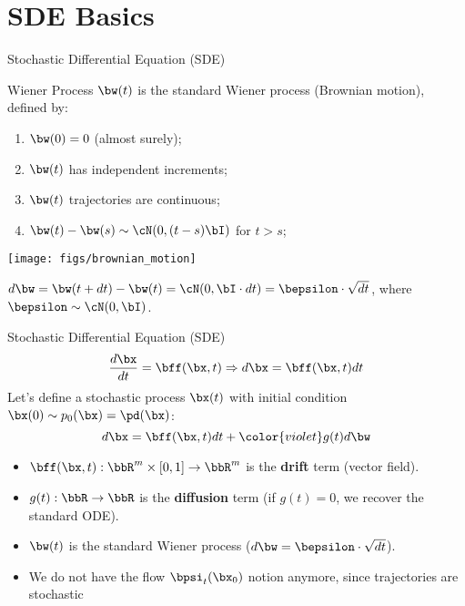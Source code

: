\documentclass{beamer}
\begin{document}
\section{SDE Basics}
\begin{frame}{Stochastic Differential Equation (SDE)}
	\begin{block}{Wiener Process}
		$\bw(t)$ is the standard Wiener process (Brownian motion), defined by:
		\vspace{-0.3cm}
		\begin{minipage}{0.5\columnwidth}
			\begin{enumerate}
				\item $\bw(0) = 0$ (almost surely);
				\item $\bw(t)$ has independent increments;
				\item $\bw(t)$ trajectories are continuous;
				\item $\bw(t) - \bw(s) \sim \cN(0, (t-s) \bI)$ for $t>s$;
			\end{enumerate}
		\end{minipage}%
		\begin{minipage}{0.45\columnwidth}
			\centering
			\texttt{[image: figs/brownian\_motion]}
		\end{minipage}
	\end{block}
	\eqpause
	$d\bw = \bw(t+dt) - \bw(t) = \cN(0, \bI \cdot dt ) = \bepsilon \cdot \sqrt{dt}$, where $\bepsilon \sim \cN(0, \bI)$.
\end{frame}
\begin{frame}{Stochastic Differential Equation (SDE)}
	\[
 		\frac{d \bx}{dt} = \bff(\bx, t) \Rightarrow d\bx = \bff(\bx, t) dt
	\]
	\eqpause
	Let's define a stochastic process $\bx(t)$ with initial condition $\bx(0) \sim p_0(\bx) = \pd(\bx)$:
	\[
		d\bx = \bff(\bx, t) dt + {\color{violet}g(t) d \bw}
	\]
	\eqpause
	\vspace{-0.5cm}
	\begin{itemize}
		 \item $\bff(\bx, t): \bbR^m \times [0, 1] \rightarrow \bbR^m$ is the \textbf{drift} term (vector field).
		 \item $g(t): \bbR \rightarrow \bbR$ is the \textbf{diffusion} term (if $g(t)=0$, we recover the standard ODE).
		 \item $\bw(t)$ is the standard Wiener process ($d\bw = \bepsilon \cdot \sqrt{dt}$).
		 \item We do not have the flow $\bpsi_t(\bx_0)$ notion anymore, since trajectories are stochastic
	\end{itemize}
\end{frame}
\end{document}
